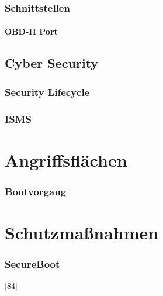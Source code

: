 \subsection{Schnittstellen}
\subsubsection{OBD-II Port} \label{OBD-II}

\section{Cyber Security}
\subsection{Security Lifecycle}
\cite{Wurm.2022}
\subsection{ISMS}


\chapter{Angriffsflächen}
\subsection{Bootvorgang}
\cite{Wurm.2022}


\chapter{Schutzmaßnahmen}
\subsection{SecureBoot}
\cite{Wurm.2022}[84]